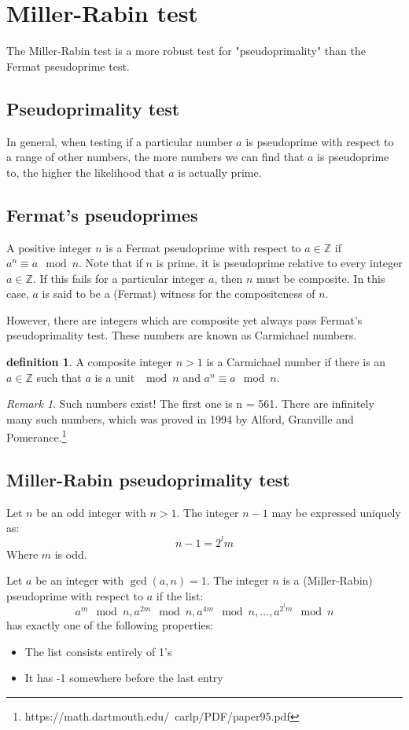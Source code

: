 \documentclass[10pt]{article}
\newcommand{\Z}{\mathbb{Z}}
\theoremstyle{definition}
\newtheorem{definition}[theorem]{definition}
\theoremstyle{remark}
\newtheorem{remark}[theorem]{Remark}
\def\Z{\mathbb{ Z}}
\begin{document}
\section{Miller-Rabin test}
The Miller-Rabin test is a more robust test for "pseudoprimality" than the Fermat pseudoprime test.
\subsection{Pseudoprimality test}
In general, when testing if a particular number $a$ is pseudoprime with respect to a range of other numbers, the more numbers we can find that $a$ is pseudoprime to, the higher the likelihood that $a$ is actually prime.
\subsection{Fermat's pseudoprimes}
A positive integer $n$ is a Fermat pseudoprime with respect to $a \in \Z$ if $a^n \equiv a \mod n$.  Note that if $n$ is prime, it is pseudoprime relative to every integer $a \in \Z$.  If this fails for a particular integer $a$, then $n$ must be composite.  In this case, $a$ is said to be a (Fermat) witness for the compositeness of $n$.

However, there are integers which are composite yet always pass Fermat's pseudoprimality test.  These numbers are known as Carmichael numbers.
\begin{definition}
A composite integer $n>1$ is a Carmichael number if there is an $a \in \Z$ such that $a$ is a unit $\mod n$ and $a^n \equiv a \mod n$.
\end{definition}
\begin{remark}
Such numbers exist!  The first one is n = 561.  There are infinitely many such numbers, which was proved in 1994 by Alford, Granville and Pomerance.\footnote{https://math.dartmouth.edu/~carlp/PDF/paper95.pdf}
\end{remark}
\subsection{Miller-Rabin pseudoprimality test}
Let $n$ be an odd integer with $n>1$.  The integer $n-1$ may be expressed uniquely as: $$n-1 = 2^lm$$ Where $m$ is odd.

Let $a$ be an integer with $\gcd(a,n)=1$.  The integer $n$ is a (Miller-Rabin) pseudoprime with respect to $a$ if the list:
$$a^m \mod n, a^{2m} \mod n,a^{4m} \mod n,\ldots,a^{2^lm} \mod n$$
has exactly one of the following properties:
\begin{itemize}
\item The list consists entirely of 1's
\item It has -1 somewhere before the last entry
\end{itemize}
\end{document}
